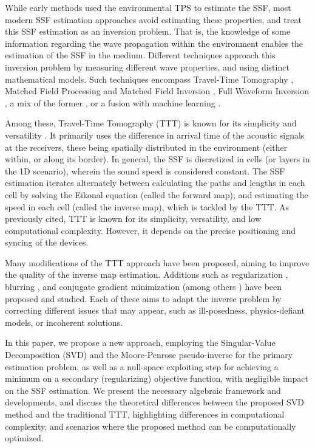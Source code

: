 While early methods used the environmental TPS to estimate the SSF, most modern SSF estimation approaches avoid estimating these properties, and treat this SSF estimation as an inversion problem. That is, the knowledge of some information regarding the wave propagation within the environment enables the estimation of the SSF in the medium. Different techniques approach this inversion problem by measuring different wave properties, and using distinct mathematical models. Such techniques encompass Travel-Time Tomography \cite{stefanov_travel_2019}, Matched Field Processing \cite{gemba_adaptive_2017} and Matched Field Inversion \cite{dosso_bayesian_2011}, Full Waveform Inversion \cite{virieux_overview_2009}, a mix of the former \cite{treister_full_2017}, or a fusion with machine learning \cite{zhang_bayesian_2021}.

Among these, Travel-Time Tomography (TTT) is known for its simplicity and versatility \cite{stefanov_travel_2019,aki_determination_1977,phillips_traveltime_1991,tang_travel_2024}. It primarily uses the difference in arrival time of the acoustic signals at the receivers, these being spatially distributed in the environment (either within, or along its border). In general, the SSF is discretized in cells (or layers in the 1D scenario), wherein the sound speed is considered constant. The SSF estimation iterates alternately between calculating the paths and lengths in each cell by solving the Eikonal equation \cite{au_geometrical_2005}
(called the forward map); and estimating the speed in each cell (called the inverse map), which is tackled by the TTT. As previously cited, TTT is known for its simplicity, versatility, and low computational complexity. However, it depends on the precise positioning and syncing of the devices.

Many modifications of the TTT approach have been proposed, aiming to improve the quality of the inverse map estimation. Additions such as regularization \cite{aki_determination_1977}, blurring \cite{ali_opensource_2019}, and conjugate gradient minimization \cite{tang_travel_2024} (among others \cite{jeong_investigating_2024,hormati_robust_2010}) have been proposed and studied. Each of these aims to adapt the inverse problem by correcting different issues that may appear, such as ill-posedness, physics-defiant models, or incoherent solutions.

In this paper, we propose a new approach, employing the Singular-Value Decomposition (SVD) and the Moore-Penrose pseudo-inverse for the primary estimation problem, as well as a null-space exploiting step for achieving a minimum on a secondary (regularizing) objective function, with negligible impact on the SSF estimation. We present the necessary algebraic framework and developments, and discuss the theoretical differences between the proposed SVD method and the traditional TTT, highlighting differences in computational complexity, and scenarios where the proposed method can be computationally optimized.

